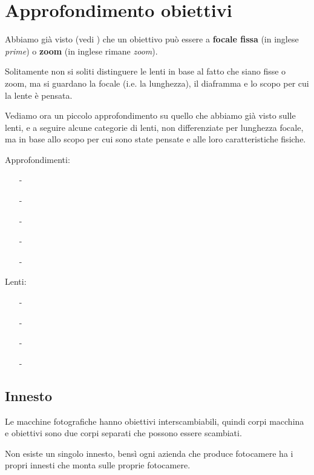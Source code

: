 \section{Approfondimento obiettivi} \label{sec:obiettivi_approfondimento}
Abbiamo già visto (vedi ) che un obiettivo può essere a \textbf{focale fissa} (in inglese \textit{prime}) o \textbf{zoom} (in inglese rimane \textit{zoom}).

Solitamente non si soliti distinguere le lenti in base al fatto che siano fisse o zoom, ma si guardano la focale (i.e. la lunghezza), il diaframma e lo scopo per cui la lente è pensata.

Vediamo ora un piccolo approfondimento su quello che abbiamo già visto sulle lenti, e a seguire alcune categorie di lenti, non differenziate per lunghezza focale, ma in base allo scopo per cui sono state pensate e alle loro caratteristiche fisiche.

Approfondimenti:
    \begin{itemize}
        \item[-] 
        \item[-] 
        \item[-] 
        \item[-] 
        \item[-]  
    \end{itemize}

Lenti:
    \begin{itemize}
        \item[-] 
        \item[-] 
        \item[-] 
        \item[-] 
    \end{itemize}


\subsection{Innesto} \label{subsec:innesto}
Le macchine fotografiche hanno obiettivi interscambiabili, quindi corpi macchina e obiettivi sono due corpi separati che possono essere scambiati.

Non esiste un singolo innesto, bensì ogni azienda che produce fotocamere ha i propri innesti che monta sulle proprie fotocamere.

